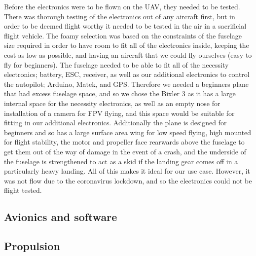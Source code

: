 \documentclass[../../main.tex]{subfiles}
\begin{document}
Before the electronics were to be flown on the UAV, they needed to be tested.
There was thorough testing of the electronics out of any aircraft first, but in order to be deemed flight worthy it needed to be tested in the air in a sacrificial flight vehicle.
The foamy selection was based on the constraints of the fuselage size required in order to have room to fit all of the electronics inside, keeping the cost as low as possible, and having an aircraft that we could fly ourselves (easy to fly for beginners).
The fuselage needed to be able to fit all of the necessity electronics; battery, ESC, receiver, as well as our additional electronics to control the autopilot; Arduino, Matek, and GPS.
Therefore we needed a beginners plane that had excess fuselage space, and so we chose the Bixler 3 as it has a large internal space for the necessity electronics, as well as an empty nose for installation of a camera for FPV flying, and this space would be suitable for fitting in our additional electronics.
Additionally the plane is designed for beginners and so has a large surface area wing for low speed flying, high mounted for flight stability, the motor and propeller face rearwards above the fuselage to get them out of the way of damage in the event of a crash, and the underside of the fuselage is strengthened to act as a skid if the landing gear comes off in a particularly heavy landing.
All of this makes it ideal for our use case.
However, it was not flow due to the coronavirus lockdown, and so the electronics could not be flight tested. 

\subsection{Avionics and software} \label{sec:design-process:final-design-proposal:avionics-and-software}


\subsection{Propulsion} \label{sec:design-process:final-design-proposal:propulsion}
\end{document}
